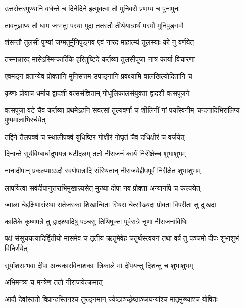 \twolineshloka
{उत्तरोत्तरपुण्यानि वर्धन्ते च दिनेदिने}
{इत्युक्त्वा तौ मुनिवरौ प्रणम्य च पुनःपुनः} %

\twolineshloka
{तावनुज्ञाप्य तौ धाम जग्मतुः परया मुदा}
{ततस्तौ तीर्थयात्रार्थं परमौ मुनिपुङ्गवौ} %

\twolineshloka
{शंसन्तौ तुलसीं पुण्यां जग्मतुर्मुनिपुङ्गव}
{एवं नारद माहात्म्यं तुलस्याः को नु वर्णयेत्} %

\twolineshloka
{तस्मान्नारद मासेऽस्मिन्कार्तिके हरितुष्टिदे}
{कर्तव्या तुलसीपूजा नात्र कार्या विचारणा} %

\twolineshloka
{एवमङ्ग व्रतान्येव प्रोक्तानि मुनिसत्तम}
{उपाङ्गानि प्रवक्ष्यामि वालखिल्योदितानि च} %





\twolineshloka
{कृष्णः प्रोवाच धर्माय द्वादशीं वत्ससंज्ञिताम्}
{गोधूलिकालसंयुक्ता द्वादशी वत्सपूजने} %

\threelineshloka
{वत्सपूजा वटे चैव कर्तव्या प्रथमेऽहनि}
{सवत्सां तुल्यवर्णां च शीलिनीं गां पयस्विनीम्}
{चन्दनादिभिरालिप्य पुष्पमालाभिरर्चयेत्} %

\twolineshloka
{तद्दिने तैलपक्वं च स्थालीपक्वं युधिष्ठिर}
{गोक्षीरं गोघृतं चैव दधिक्षीरं च वर्जयेत्} %

\twolineshloka
{दिनान्ते सूर्यबिम्बार्धादुभयत्र घटीदलम्}
{ततो नीराजनं कार्यं निरीक्षेच्च शुभाशुभम्} %

\twolineshloka
{नानादीपान् प्रकल्प्याऽऽदौ स्वर्णपात्रादि संस्थितान्}
{नीराजयेद्दीपपूर्वं निरीक्षेत शुभाशुभम्} %

\twolineshloka
{लापयित्वा सर्वदीपानुत्तराभिमुखान्न्यसेत्}
{मुख्या दीपा नव प्रोक्ता अन्यानपि च कल्पयेत्} %

\twolineshloka
{ज्वाला चेद्दक्षिणासंस्था सतेजस्का शिखान्विता}
{स्थिरा चेत्सौख्यदा प्रोक्ता विपरीता तु दुःखदा} %

\twolineshloka
{कार्तिके कृष्णपत्रे तु द्वादश्यादिषु पञ्चसु}
{तिथिषूक्तः पूर्वरात्रे नृणां नीराजनाविधिः} %

\threelineshloka
{पक्षं संसूचयत्यादिर्द्वितीयो मासमेव च}
{तृतीय ऋतुमेवेह चतुर्थस्त्वयनं तथा}
{वर्षं तु पञ्चमो दीपः शुभाशुभं विनिर्णयेत्} %

\twolineshloka
{सूर्यांशसम्भवा दीपा अन्धकारविनाशकाः}
{त्रिकाले मां दीपयन्तु दिशन्तु च शुभाशुभम्} %


\onelineshloka
{अभिमन्त्र्य च मन्त्रेण ततो नीराजयेत्क्रमात्} %

\twolineshloka
{आदौ देवांस्ततो विप्रान्हस्तिनश्च तुरङ्गमान्}
{ज्येष्ठाञ्च्छ्रेष्ठाञ्जघन्यांश्च मातृमुख्याश्च योषितः} %

